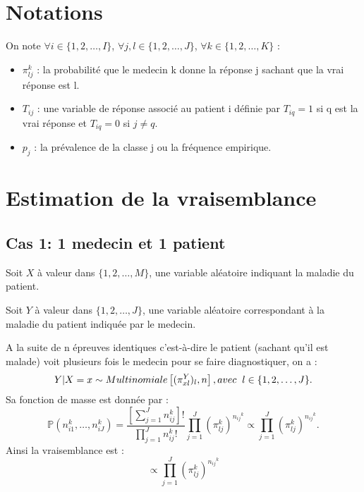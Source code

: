 \documentclass[a4paper,french,10pt]{article}
\begin{document}
	
	\section{Notations}
	
	On note $\forall i \in \{1, 2, \dots,I\}$, $\forall j, l \in \{1, 2, \dots,J\}$, $\forall k \in \{1, 2, \dots,K\}$ : \\
	
	\begin{itemize}
		\item $\pi_{lj}^k$ : la probabilité que le medecin k donne la réponse j sachant que la vrai réponse est l.
		\item $T_{ij}$ : une variable de réponse associé au patient i définie par $T_{iq} = 1$  si q est la vrai réponse et $T_{iq} = 0$ si $j \neq q$.
		\item $p_j$ : la prévalence de la classe j ou la fréquence empirique.
		
	\end{itemize}
	
%	
	

	\section{Estimation de la vraisemblance}
	\subsection{Cas 1: 1 medecin et 1 patient}
	
	Soit $X$ à valeur dans $\{1, 2, \dots ,M\}$, une variable aléatoire indiquant la maladie du patient.
	
	Soit $Y$ à valeur dans $\{1, 2, \dots ,J\}$, une variable aléatoire correspondant à la maladie du patient indiquée par le medecin.
	
	A la suite de n épreuves identiques c'est-à-dire le patient (sachant qu'il est malade) voit plusieurs fois le medecin pour se faire diagnostiquer, on a :
	\[Y | X=x \sim Multinomiale \left[(\pi_{xl}^Y)_{l}, n\right], avec\hspace{2mm}l \in \{1, 2, \dots,J\} .\]
	Sa fonction de masse est donnée par : \[\mathbb{P}\left(n_{i1}^k, \dots, n_{iJ}^k\right) = \frac{\left[\sum_{j=1}^{J} n_{ij}^k\right]!}{\prod_{j=1}^{J} n_{ij}^k !} \prod_{j=1}^{J} \left(\pi_{lj}^k\right)^{{n_{ij}}^{k}} \propto \prod_{j=1}^{J} \left(\pi_{lj}^k\right)^{{n_{ij}}^{k}}.\]
	Ainsi la vraisemblance est : \[\propto \prod_{j=1}^{J} \left(\pi_{lj}^k\right)^{{n_{ij}}^{k}}\]
	
\end{document}
